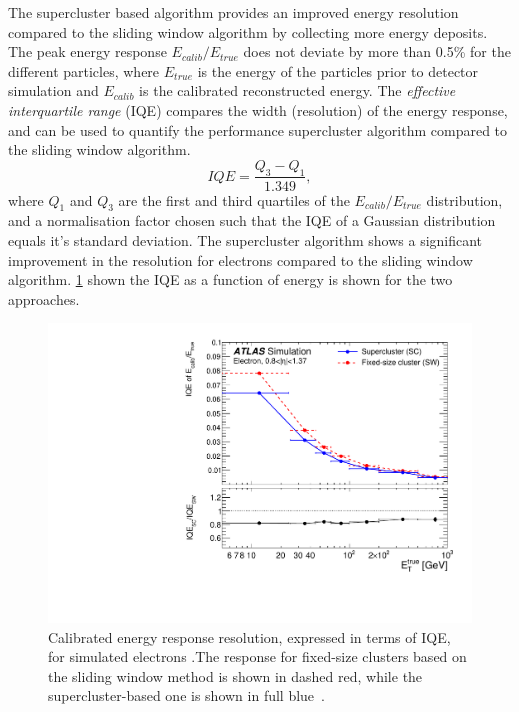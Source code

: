 The supercluster based algorithm provides an improved energy resolution compared to the sliding window algorithm by collecting more energy deposits. The peak energy response $E_{calib}/E_{true}$ does not deviate by more than 0.5\% for the different particles, where $E_{true}$ is the energy of the particles prior to detector simulation and $E_{calib}$ is the calibrated reconstructed energy. The \emph{effective interquartile range} (IQE) compares the width (resolution) of the energy response, and can be used to quantify the performance supercluster algorithm compared to the sliding window algorithm. 
\begin{equation}
    IQE = \frac{Q_3 - Q_1}{1.349},
\end{equation}
where $Q_1$ and $Q_3$ are the first and third quartiles of the $E_{calib}/E_{true}$ distribution, and a normalisation factor chosen such that the IQE of a Gaussian distribution equals it's standard deviation. The supercluster algorithm shows a significant improvement in the resolution for electrons compared to the sliding window algorithm. \cref{fig:method:iqe} shown the IQE as a function of energy is shown for the two approaches. 
\begin{figure}[h]
    \centering
    \includegraphics[width=\mediumfigwidth]{images/IQE_reco_1.pdf}
    \caption[Calibrated energy response resolution, expressed in terms of IQE, for simulated electrons]{Calibrated energy response resolution, expressed in terms of IQE, for simulated electrons .The response for fixed-size clusters based on the sliding window method is shown in dashed red, while the supercluster-based one is shown in full blue~\cite{Aad:2019tso}.}
    \label{fig:method:iqe}
\end{figure}

